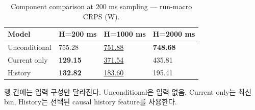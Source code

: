 \begin{table}[t]
\centering
\caption{Component comparison at 200 ms sampling — run-macro CRPS (W).}
\label{tab:a3a_component_ablation}
\small
\begin{tabular}{llll}
\toprule
Model & H=200 ms & H=1000 ms & H=2000 ms \\
\midrule
Unconditional & 755.28 & \underline{751.88} & \textbf{748.68} \\
Current only & \textbf{129.15} & \underline{371.54} & 435.81 \\
History & \textbf{132.82} & \underline{183.60} & 195.41 \\
\bottomrule
\end{tabular}
\vspace{2pt}\par\footnotesize 행 간에는 입력 구성만 달라진다. Unconditional은 입력 없음, Current only는 최신 bin, History는 선택된 causal history feature를 사용한다.
\end{table}
